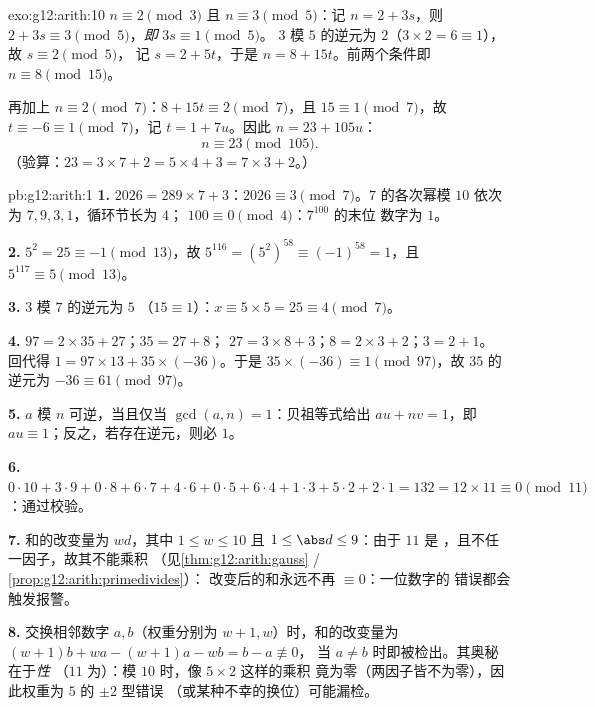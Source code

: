 \begin{solution}{exo:g12:arith:10}
$n \equiv 2 \pmod 3$ 且 $n \equiv 3 \pmod 5$：记 $n = 2 + 3s$，则
$2 + 3s \equiv 3 \pmod 5$，\emph{即} $3s \equiv 1 \pmod 5$。
$3$ 模 $5$ 的逆元为 $2$（$3\times2 = 6 \equiv 1$），故 $s \equiv 2 \pmod 5$，
记 $s = 2 + 5t$，于是 $n = 8 + 15t$。前两个条件即
$n \equiv 8 \pmod{15}$。

再加上 $n \equiv 2 \pmod 7$：$8 + 15t \equiv 2 \pmod 7$，且
$15 \equiv 1 \pmod 7$，故 $t \equiv -6 \equiv 1 \pmod 7$，记
$t = 1 + 7u$。因此 $n = 23 + 105u$：
\[
n \equiv 23 \pmod{105}.
\]
（验算：$23 = 3\times7 + 2 = 5\times4 + 3 = 7\times3 + 2$。）
\end{solution}

\begin{solution}{pb:g12:arith:1}
\textbf{1.} $2026 = 289 \times 7 + 3$：$2026 \equiv 3
\pmod 7$。$7$ 的各次幂模 $10$ 依次为 $7, 9, 3, 1$，循环节长为 $4$；
$100 \equiv 0 \pmod 4$：$7^{100}$ 的末位
数字为 $1$。

\textbf{2.} $5^2 = 25 \equiv -1 \pmod{13}$，故
$5^{116} = \left(5^2\right)^{58} \equiv (-1)^{58} = 1$，且
$5^{117} \equiv 5 \pmod{13}$。

\textbf{3.} $3$ 模 $7$ 的逆元为 $5$
（$15 \equiv 1$）：$x \equiv 5 \times 5 = 25 \equiv 4 \pmod 7$。

\textbf{4.} $97 = 2 \times 35 + 27$；$35 = 27 + 8$；
$27 = 3 \times 8 + 3$；$8 = 2 \times 3 + 2$；$3 = 2 + 1$。
回代得 $1 = 97 \times 13 + 35 \times (-36)$。于是
$35 \times (-36) \equiv 1 \pmod{97}$，故 $35$ 的逆元为
$-36 \equiv 61 \pmod{97}$。

\textbf{5.} $a$ 模 $n$ 可逆，当且仅当
$\gcd(a, n) = 1$：贝祖等式给出 $au + nv = 1$，即\
$au \equiv 1$；反之，若存在逆元，则必
$1$。

\textbf{6.} $0{\cdot}10 + 3{\cdot}9 + 0{\cdot}8 + 6{\cdot}7 +
4{\cdot}6 + 0{\cdot}5 + 6{\cdot}4 + 1{\cdot}3 + 5{\cdot}2 +
2{\cdot}1 = 132 = 12 \times 11 \equiv 0 \pmod{11}$：通过校验。

\textbf{7.} 和的改变量为 $wd$，其中
$1 \leq w \leq 10$ 且 $1 \leq \abs d \leq 9$：由于 $11$ 是
，且不任一因子，故其不能乘积
（见\cref{thm:g12:arith:gauss} / \cref{prop:g12:arith:primedivides}）：
改变后的和永远不再 $\equiv 0$：一位数字的
错误都会触发报警。

\textbf{8.} 交换相邻数字 $a, b$（权重分别为
$w + 1, w$）时，和的改变量为
$(w+1)b + wa - (w+1)a - wb = b - a \not\equiv 0$，
当 $a \neq b$ 时即被检出。其奥秘在于\emph{性}
（$11$ 为\omterm{def:g12:arith:prime}{质数}）：模 $10$ 时，像 $5 \times 2$ 这样的乘积
竟为零（两因子皆不为零），因此权重为 $5$ 的 $\pm 2$ 型错误
（或某种不幸的换位）可能漏检。


\end{solution}
